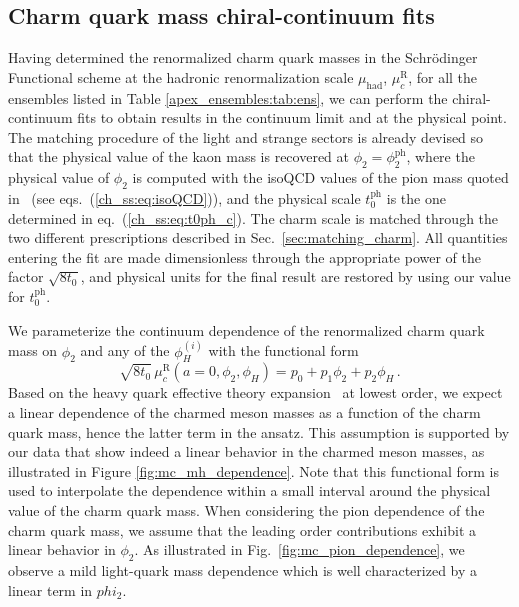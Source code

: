 
\subsection{Charm quark mass chiral-continuum fits}
\label{subsec:mc_chiral_continuum}

Having determined the  renormalized charm quark masses in the Schr\"odinger Functional scheme at the hadronic renormalization scale $\mu_{\mathrm{had}}$, $\mu_c^{\textrm{R}}$, for all the ensembles listed in Table \ref{apex_ensembles:tab:ens}, we can perform the chiral-continuum fits to obtain results in the continuum limit and at the physical point. The matching procedure of the light
and strange sectors is already devised so that the physical value of the kaon mass is recovered
at $\phi_2 = \phi_2^{\mathrm{ph}}$, where the physical value of $\phi_2$ is computed
with the isoQCD values of the pion mass quoted 
in~\cite{FlavourLatticeAveragingGroupFLAG:2021npn} (see eqs.~(\ref{ch_ss:eq:isoQCD})), and the physical scale $t_0^{\mathrm{ph}}$
is the one determined in eq.~(\ref{ch_ss:eq:t0ph_c}). The charm scale is matched through the two different
prescriptions described in Sec.~\ref{sec:matching_charm}. All quantities entering the fit
are made dimensionless through the appropriate power of the factor $\sqrt{8t_0}$,
and physical units for the final result are restored by using our value for $t_0^{\mathrm{ph}}$.

We parameterize the continuum dependence of the renormalized charm quark mass on $\phi_2$
and any of the $\phi_H^{(i)}$ with the functional form
\begin{equation}
	\sqrt{8t_0}\, \mu_c^{\textrm{R}}(a=0, \phi_2, \phi_H) = p_0 + p_1\phi_2 + p_2\phi_H\,.
	\label{eq:mc_continuum_parameterization}
\end{equation}
Based on the heavy quark effective theory expansion~\cite{Georgi:1990um} at lowest order,
we expect a linear dependence of the charmed meson masses as a function of the charm quark 
mass, hence the latter term in the ansatz. This assumption is supported by our data that show indeed a 
linear behavior in the charmed meson masses, as illustrated in Figure \ref{fig:mc_mh_dependence}. Note that this functional form is used to interpolate the dependence within a small interval around the physical value of the charm quark mass. When considering the pion dependence of the charm quark mass, we assume that the  leading order contributions exhibit a linear behavior in $\phi_2$. As illustrated in Fig.~\ref{fig:mc_pion_dependence}, we observe a mild light-quark mass dependence  which is well characterized by a  linear term in $phi_2$.

